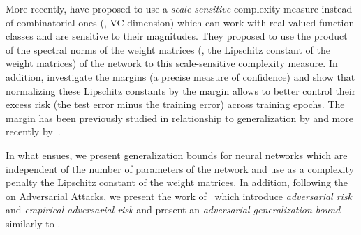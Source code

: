 More recently, \citet{bartlett2017spectrally} have proposed to use a \emph{scale-sensitive} complexity measure instead of combinatorial ones (\ie, VC-dimension) which can work with real-valued function classes and are sensitive to their magnitudes.
They proposed to use the product of the spectral norms of the weight matrices (\ie, the Lipschitz constant of the weight matrices) of the network to this scale-sensitive complexity measure.
In addition, \citeauthor{bartlett2017spectrally} investigate the margins (a precise measure of confidence) and show that normalizing these Lipschitz constants by the margin allows to better control their excess risk (the test error minus the training error) across
training epochs.
The margin has been previously studied in relationship to generalization by \citet{langford2002pac} and more recently by~\citet{neyshabur2018pacbayesian}.

In what ensues, we present generalization bounds for neural networks which are independent of the number of parameters of the network and use as a complexity penalty the Lipschitz constant of the weight matrices.
In addition, following the  on Adversarial Attacks, we present the work of~\citet{farnia2018generalizable} which introduce \emph{adversarial risk} and \emph{empirical adversarial risk} and present an \emph{adversarial generalization bound} similarly to \citet{bartlett2017spectrally}.

